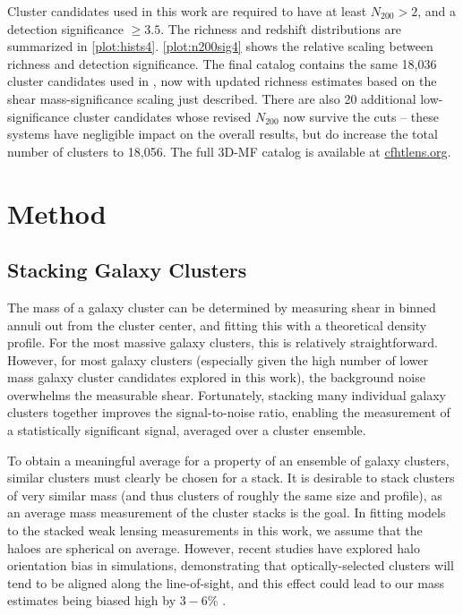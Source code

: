 Cluster candidates used in this work are required to have at least $N_{200} > 2$, and a detection significance $\ge 3.5$. The richness and redshift distributions are summarized in \autoref{plot:hists4}. \autoref{plot:n200sig4} shows the relative scaling between richness and detection significance. The final catalog contains the same 18,036 cluster candidates used in \citet{Ford14}, now with updated richness estimates based on the shear mass-significance scaling just described. There are also 20 additional low-significance cluster candidates whose revised $N_{200}$ now survive the cuts -- these systems have negligible impact on the overall results, but do increase the total number of clusters to 18,056. The full \ac{3D-MF} catalog is available at \url{cfhtlens.org}.  



\section{Method}
\label{sec:method4}

\subsection{Stacking Galaxy Clusters}

The mass of a galaxy cluster can be determined by measuring shear in binned annuli out from the cluster center, and fitting this with a theoretical density profile. For the most massive galaxy clusters, this is relatively straightforward. However, for most galaxy clusters (especially given the high number of lower mass galaxy cluster candidates explored in this work), the background noise overwhelms the measurable shear.  Fortunately, stacking many individual galaxy clusters together improves the signal-to-noise ratio, enabling the measurement of a statistically significant signal, averaged over a cluster ensemble.

To obtain a meaningful average for a property of an ensemble of galaxy clusters, similar clusters must clearly be chosen for a stack. It is desirable to stack clusters of very similar mass (and thus clusters of roughly the same size and profile), as an average mass measurement of the cluster stacks is the goal. In fitting models to the stacked weak lensing measurements in this work, we assume that the haloes are spherical on average. However, recent studies have explored halo orientation bias in simulations, demonstrating that optically-selected clusters will tend to be aligned along the line-of-sight, and this effect could lead to our mass estimates being biased high by $3-6$\% \citep{Dietrich14}.

